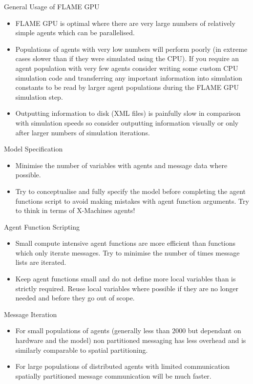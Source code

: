 \documentclass[11pt, a4paper, onecolumn, oneside]{report}
\begin{document}
General Usage of FLAME GPU
\begin{itemize}
    \item FLAME GPU is optimal where there are very large numbers of relatively simple agents which can be parallelised.
    \item Populations of agents with very low numbers will perform poorly (in extreme cases slower than if they were simulated using the CPU).
        If you require an agent population with very few agents consider writing some custom CPU simulation code and transferring any important information into simulation constants to be read by larger agent populations during the FLAME GPU simulation step.
    \item Outputting information to disk (XML files) is painfully slow in comparison with simulation speeds so consider outputting information visually or only after larger numbers of simulation iterations.
\end{itemize}

Model Specification

\begin{itemize}
    \item Minimise the number of variables with agents and message data where possible.
    \item Try to conceptualise and fully specify the model before completing the agent functions script to avoid making mistakes with agent function arguments.
        Try to think in terms of X-Machines agents!
\end{itemize}

Agent Function Scripting

\begin{itemize}
    \item Small compute intensive agent functions are more efficient than functions which only iterate messages.
        Try to minimise the number of times message lists are iterated.
    \item Keep agent functions small and do not define more local variables than is strictly required.
        Reuse local variables where possible if they are no longer needed and before they go out of scope.
\end{itemize}

Message Iteration

\begin{itemize}
    \item For small populations of agents (generally less than 2000 but dependant on hardware and the model) non partitioned messaging has less overhead and is similarly comparable to spatial partitioning.
    \item For large populations of distributed agents with limited communication spatially partitioned message communication will be much faster.
\end{itemize}

% 
\end{document}
